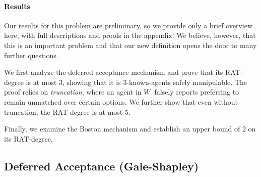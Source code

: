 \paragraph{Results} Our results for this problem are preliminary, so we provide only a brief overview here, with full descriptions and proofs in the appendix. We believe, however, that this is an important problem and that our new definition opens the door to many further questions.

We first analyze the deferred acceptance mechanism and prove that its RAT-degree is at most $3$, showing that it is $3$-known-agents safely manipulable. The proof relies on \emph{truncation}, where an agent in $W$ falsely reports preferring to remain unmatched over certain options. We further show that even without truncation, the RAT-degree is at most $5$.

Finally, we examine the Boston mechanism and establish an upper bound of $2$ on its RAT-degree.


\subsection{Deferred Acceptance (Gale-Shapley)}\label{sec:deferred-acceptance}

